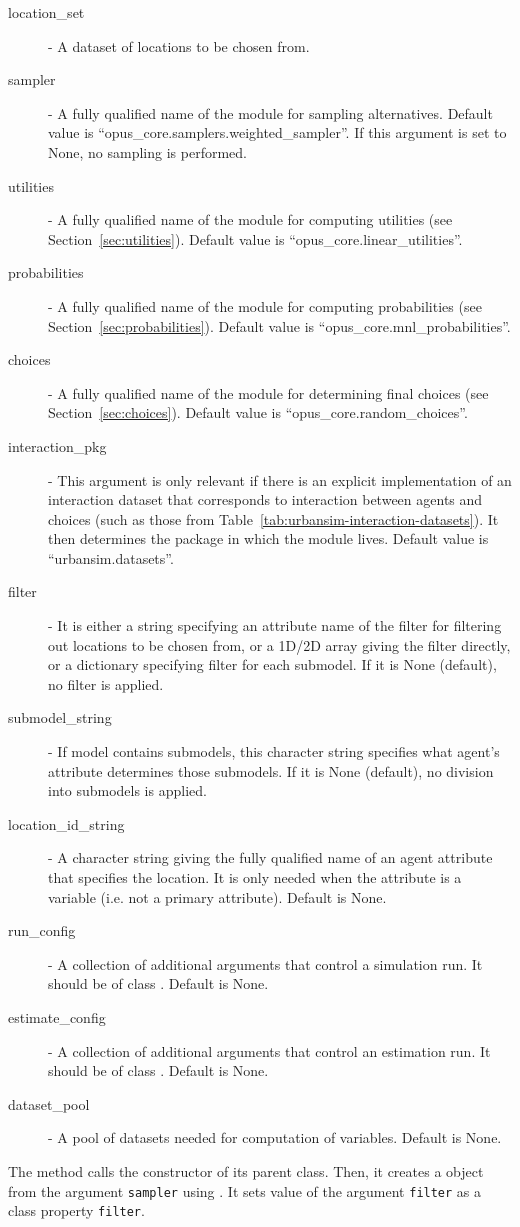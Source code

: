 \begin{description}
\item[location_set] - A dataset of locations to be chosen from.
\item[sampler] - A fully qualified name of the module for sampling
  alternatives. Default value is ``opus_core.samplers.weighted_sampler''. If
  this argument is set to None, no sampling is performed.
\item[utilities] - A fully qualified name of the module for computing utilities
  (see Section~\ref{sec:utilities}). Default value is
  ``opus_core.linear_utilities''.
\item[probabilities] - A fully qualified name of the module for computing
  probabilities (see Section~\ref{sec:probabilities}). Default value is
  ``opus_core.mnl_probabilities''.
\item[choices] - A fully qualified name of the module for determining
  final choices (see Section~\ref{sec:choices}). Default value is
  ``opus_core.random_choices''.
\item[interaction_pkg] - This argument is only relevant if there is an
  explicit implementation of an interaction dataset that corresponds to
  interaction between agents and choices (such as those from
  Table~\ref{tab:urbansim-interaction-datasets}). It then determines the
  package in which the module lives. Default value is
  ``urbansim.datasets''. 
\item[filter] - It is either a string specifying an attribute name of the
  filter for filtering out locations to be chosen from, or a 1D/2D array giving the filter directly, or a dictionary
  specifying filter for each submodel. If it is None (default), no filter is
  applied.
\item[submodel_string] - If model contains submodels, this character string
  specifies what agent's attribute determines those submodels. If it is None
  (default), no division into submodels is applied.
\item[location_id_string] - A character string giving the fully qualified name of an agent attribute
  that specifies the location. It is only needed when the attribute is a variable (i.e. not a primary attribute).
  Default is None.
\item[run_config] - A collection of additional arguments that control a
  simulation run. It should be of class . Default is None.
\item[estimate_config] - A collection of additional arguments that control an
  estimation run. It should be of class . Default is None.
\item[dataset_pool] - A pool of datasets needed for computation of variables. Default is None.
\end{description}
The method calls the constructor of its parent class. Then, it creates a
 object from the argument \verb|sampler| using
. It sets value of the argument \verb|filter| as a class
property \verb|filter|.


